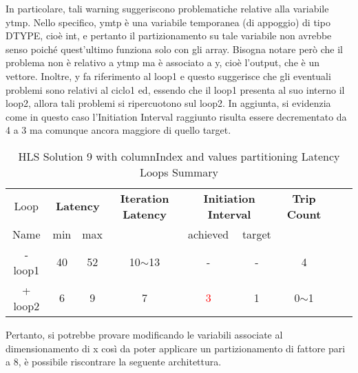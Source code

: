 In particolare, tali warning suggeriscono problematiche relative alla variabile ytmp. Nello specifico, ymtp è una variabile temporanea (di appoggio) di tipo DTYPE, cioè int, e pertanto il partizionamento su tale variabile non avrebbe senso poiché quest'ultimo funziona solo con gli array. Bisogna notare però che il problema non è relativo a ytmp ma è associato a y, cioè l'output, che è un vettore. Inoltre, y fa riferimento al loop1 e questo suggerisce che gli eventuali problemi sono relativi al ciclo1 ed, essendo che il loop1 presenta al suo interno il loop2, allora tali problemi si ripercuotono sul loop2. In aggiunta, si evidenzia come in questo caso l'Initiation Interval raggiunto risulta essere decrementato da 4 a 3 ma comunque ancora maggiore di quello target. 

\begin{table}[H]
	\centering
	\begin{tabular}{|c|c|c|c|c|c|c|c|c|}
		\hline
		\multicolumn{1}{|c|}{Loop} & \multicolumn{2}{|c|}{\textbf{Latency}} & \multicolumn{1}{c|}{\textbf{Iteration Latency}} & \multicolumn{2}{c|}{\textbf{Initiation Interval}} & \multicolumn{1}{c|}{\textbf{Trip Count}}  \\
		Name & min & max &  & achieved & target &  \\
		\hline
		- loop1 & 40 & 52 & 10$\sim$13 & - & - & 4 \\
		+ loop2 & 6 & 9 & 7 & \textcolor{red}{3} & 1 & 0$\sim$1 \\
		\hline
	\end{tabular}
	\caption{HLS Solution 9 with columnIndex and values partitioning Latency Loops Summary}
	\label{tab:hls-solution-9-columnindex-values-partitioning-loop-summary}
\end{table}

Pertanto, si potrebbe provare modificando le variabili associate al dimensionamento di x così da poter applicare un partizionamento di fattore pari a 8, è possibile riscontrare la seguente architettura.




